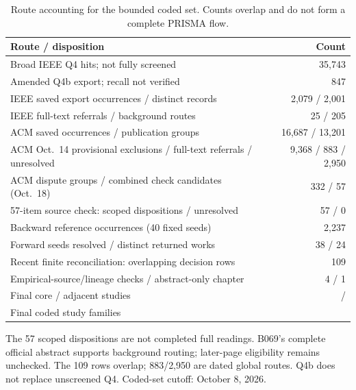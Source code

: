 \begin{table}[htbp]
\centering\small
\caption{Route accounting for the bounded coded set. Counts overlap and do not form a complete PRISMA flow.}
\label{tab:selection-flow}
\begin{tabularx}{\columnwidth}{@{}Yr@{}}
\toprule
Route / disposition & Count\\
\midrule
Broad IEEE Q4 hits; not fully screened & 35,743\\
Amended Q4b export; recall not verified & 847\\
IEEE saved export occurrences / distinct records & 2,079 / 2,001\\
IEEE full-text referrals / background routes & 25 / 205\\
ACM saved occurrences / publication groups & 16,687 / 13,201\\
ACM Oct.\ 14 provisional exclusions / full-text referrals / unresolved & 9,368 / 883 / 2,950\\
ACM dispute groups / combined check candidates (Oct.\ 18) & 332 / 57\\
57-item source check: scoped dispositions / unresolved & 57 / 0\\
Backward reference occurrences (40 fixed seeds) & 2,237\\
Forward seeds resolved / distinct returned works & 38 / 24\\
Recent finite reconciliation: overlapping decision rows & 109\\
Empirical-source/lineage checks / abstract-only chapter & 4 / 1\\
Final core / adjacent studies & \FinalCore{} / \FinalAdjacent{}\\
Final coded study families & \FinalN{}\\
\bottomrule
\end{tabularx}
\par\smallskip\footnotesize The 57 scoped dispositions are not completed full readings. B069's complete official abstract supports background routing; later-page eligibility remains unchecked. The 109 rows overlap; 883/2,950 are dated global routes. Q4b does not replace unscreened Q4. Coded-set cutoff: October 8, 2026.
\end{table}
